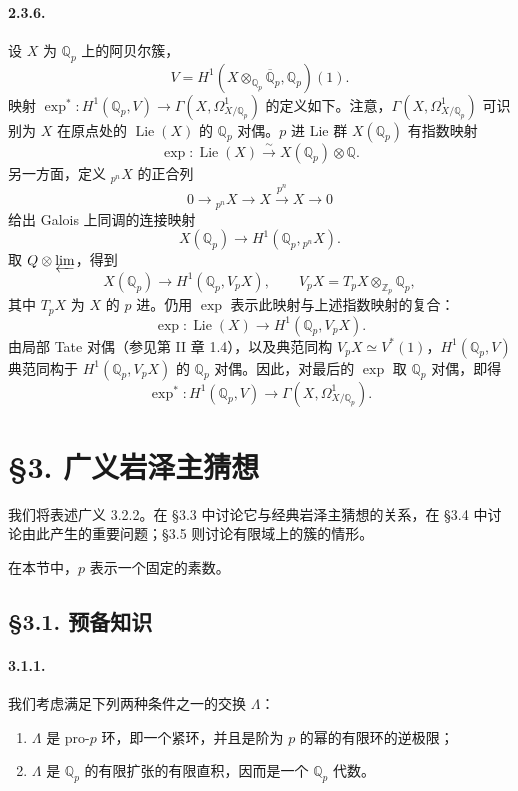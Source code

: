 \paragraph{2.3.6.} 设 $X$ 为 $\mathbb Q_p$ 上的阿贝尔簇，
\[
 V=H^1(X\otimes_{\mathbb Q_p}\overline{\mathbb Q}_p,\mathbb Q_p)(1).
\]
映射 $\exp^*:H^1(\mathbb Q_p,V)\to\Gamma(X,\Omega^1_{X/\mathbb Q_p})$ 的定义如下。注意，$\Gamma(X,\Omega^1_{X/\mathbb Q_p})$ 可识别为 $X$ 在原点处的 $\operatorname{Lie}(X)$ 的 $\mathbb Q_p$ 对偶。$p$ 进 Lie 群 $X(\mathbb Q_p)$ 有指数映射
\[
 \exp:\operatorname{Lie}(X)\xrightarrow{\sim}X(\mathbb Q_p)\otimes\mathbb Q.
\]
另一方面，定义 ${}_{p^n}X$ 的正合列
\[
 0\longrightarrow{}_{p^n}X\longrightarrow X\xrightarrow{p^n}X\longrightarrow0
\]
给出 Galois 上同调的连接映射
\[
 X(\mathbb Q_p)\longrightarrow H^1(\mathbb Q_p,{}_{p^n}X).
\]
取 $\mathbb Q\otimes\varprojlim$，得到
\[
 X(\mathbb Q_p)\longrightarrow H^1(\mathbb Q_p,V_pX),\qquad
 V_pX=T_pX\otimes_{\mathbb Z_p}\mathbb Q_p,
\]
其中 $T_pX$ 为 $X$ 的 $p$ 进。仍用 $\exp$ 表示此映射与上述指数映射的复合：
\[
 \exp:\operatorname{Lie}(X)\longrightarrow H^1(\mathbb Q_p,V_pX).
\]
由局部 Tate 对偶（参见第 II 章 1.4），以及典范同构 $V_pX\simeq V^*(1)$，$H^1(\mathbb Q_p,V)$ 典范同构于 $H^1(\mathbb Q_p,V_pX)$ 的 $\mathbb Q_p$ 对偶。因此，对最后的 $\exp$ 取 $\mathbb Q_p$ 对偶，即得
\[
 \exp^*:H^1(\mathbb Q_p,V)\longrightarrow\Gamma(X,\Omega^1_{X/\mathbb Q_p}).
\]

\section*{§3. 广义岩泽主猜想}
我们将表述广义 3.2.2。在 §3.3 中讨论它与经典岩泽主猜想的关系，在 §3.4 中讨论由此产生的重要问题；§3.5 则讨论有限域上的簇的情形。

在本节中，$p$ 表示一个固定的素数。

\subsection*{§3.1. 预备知识}
\paragraph{3.1.1.} 我们考虑满足下列两种条件之一的交换 $\Lambda$：
\begin{enumerate}[label=(\arabic*)]
\item $\Lambda$ 是 pro-$p$ 环，即一个紧环，并且是阶为 $p$ 的幂的有限环的逆极限；
\item $\Lambda$ 是 $\mathbb Q_p$ 的有限扩张的有限直积，因而是一个 $\mathbb Q_p$ 代数。
\end{enumerate}

